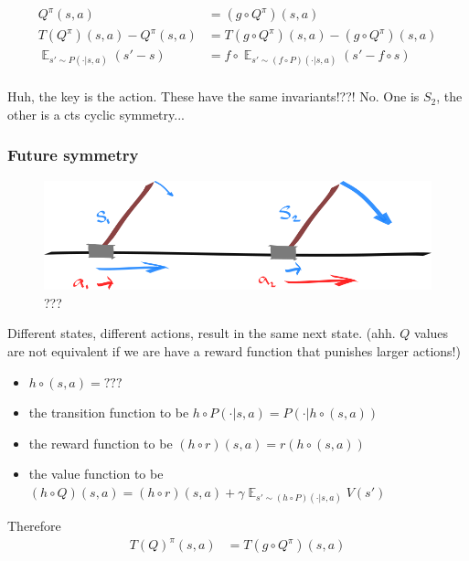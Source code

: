 \begin{align*}
Q^\pi(s, a) &= (g \circ Q^{\pi})(s, a) \tag{expected return}\\
T(Q^\pi)(s,a) - Q^\pi(s,a) &=T(g \circ Q^\pi)(s, a) - (g \circ Q^\pi)(s,a) \tag{Bellman residual}\\
\mathop{\mathbb E}_{s' \sim P(\cdot| s, a)} (s' - s) &= f \circ \mathop{\mathbb E}_{s' \sim (f \circ P)(\cdot| s, a)} (s' - f \circ s) \tag{change in state}\\
\end{align*}

{\color{red}Huh, the key is the action. These have the same invariants!??! No. One is $S_2$, the other is a cts cyclic symmetry...}


\subsubsection{Future symmetry}

\begin{figure}[!h]
\centering
\includegraphics[width=1\textwidth,height=0.25\textheight]{../../pictures/drawings/cart-pole-state.png}
\caption{???}
\end{figure}

Different states, different actions, result in the same next state.
(ahh. $Q$ values are not equivalent if we are have a reward function that punishes larger actions!)


\begin{itemize}
\tightlist
  \item $h \circ (s, a) = ???$
  \item the transition function to be $h\circ P(\cdot|s, a) = P(\cdot|h \circ (s, a))$
  \item the reward function to be $(h \circ r)(s, a) = r(h \circ (s, a))$
  \item the value function to be $(h\circ Q)(s, a) = (h \circ r)(s, a) + \gamma \mathop{\mathbb E}_{s' \sim (h\circ P)(\cdot|s, a)} V(s')$
\end{itemize}

Therefore
\begin{align*}
T(Q)^\pi(s, a) &= T(g \circ Q^{\pi})(s, a) \tag{future expected return}\\
\end{align*}

